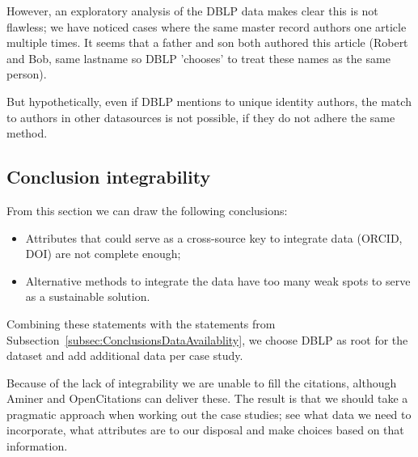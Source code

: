 \documentclass{ou-report}
\newcommand{\todo}[1]{{\color{red} TODO: #1}}
\begin{document}
However, an exploratory analysis of the DBLP data makes clear this is not 
flawless; we have noticed cases where the same master record authors one 
article multiple times. It seems that a father and son both authored this 
article (Robert and Bob, same lastname so DBLP 'chooses' to treat these names
as the same person).

But hypothetically, even if DBLP mentions to unique identity authors, 
the match to authors in other datasources is not possible, if they do 
not adhere the same method.





\subsection{Conclusion integrability}
From this section we can draw the following conclusions:
\begin{itemize}
    \item Attributes that could serve as a cross-source key to integrate data 
    (ORCID, DOI) are not complete enough;
    \item Alternative methods to integrate the data have too many weak spots to
    serve as a sustainable solution.
\end{itemize}

Combining these statements with the statements from 
Subsection~\ref{subsec:ConclusionsDataAvailablity}, we choose DBLP as root for
the dataset and add additional data per case study.

Because of the lack of integrability we are unable to fill the citations, 
although Aminer and OpenCitations can deliver these. The result is that we 
should take a pragmatic approach when working out the case studies; see what 
data we need to incorporate, what attributes are to our disposal and make 
choices based on that information.
\end{document}
